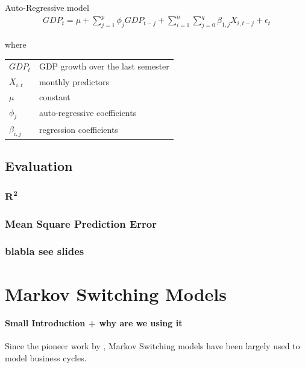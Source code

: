 \documentclass[12pt,a4paper,oneside]{book}
\begin{document}
Auto-Regressive model
\begin{eqnarray}
    GDP_{t} = \mu + \sum^p_{j = 1} \phi_j GDP_{t-j} +         \sum^n_{i = 1} \sum^q_{j = 0}
       \beta_{1,j} X_{i,t-j} + \epsilon_t 
\end{eqnarray}

where   \\
\begin{tabular}{l l}
    $GDP_t$     & GDP growth over the last semester \\
    $X_{i,t}$   & monthly predictors \\
    $\mu$       & constant \\
    $\phi_j$    & auto-regressive coefficients \\
    $\beta_{i,j}$ & regression coefficients \\
\end{tabular}



\section{Evaluation}

\subsection{$\mathbf{R^2}$}

\subsection{Mean Square Prediction Error}


\subsection{blabla see slides}


\chapter{Markov Switching Models}



\subsubsection{Small Introduction + why are we using it}

Since the pioneer work by \cite{hamilton_new_1989}, Markov Switching models have been largely used to model business cycles.
\end{document}
